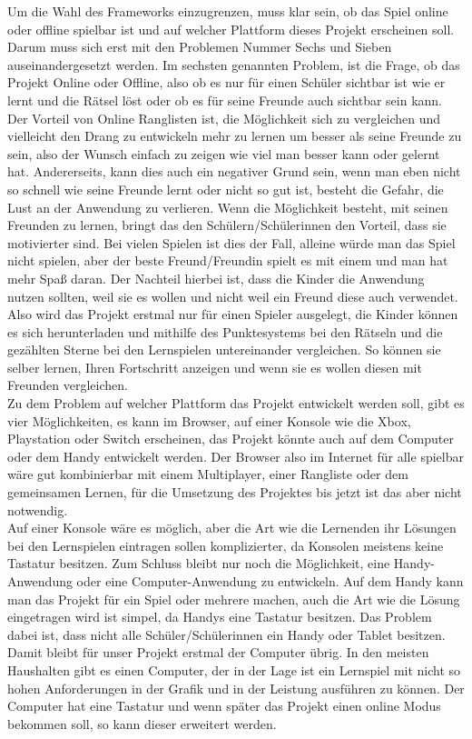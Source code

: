 Um die Wahl des Frameworks einzugrenzen, muss klar sein, ob das Spiel online oder offline spielbar ist und auf welcher Plattform dieses Projekt erscheinen soll.\\
Darum muss sich erst mit den Problemen Nummer Sechs und Sieben auseinandergesetzt werden.
Im sechsten genannten Problem, ist die Frage, ob das Projekt Online oder Offline, also ob es nur für einen Schüler sichtbar ist wie er lernt und die Rätsel löst oder ob es für seine Freunde auch sichtbar sein kann. Der Vorteil von Online Ranglisten ist, die Möglichkeit sich zu vergleichen und vielleicht den Drang zu entwickeln mehr zu lernen um besser als seine Freunde zu sein, also der Wunsch einfach zu zeigen wie viel man besser kann oder gelernt hat. Andererseits, kann dies auch ein negativer Grund sein, wenn man eben nicht so schnell wie seine Freunde lernt oder nicht so gut ist, besteht die Gefahr, die Lust an der Anwendung zu verlieren. Wenn die Möglichkeit besteht, mit seinen Freunden zu lernen, bringt das den Schülern/Schülerinnen den Vorteil, dass sie motivierter sind. Bei vielen Spielen ist dies der Fall, alleine würde man das Spiel nicht spielen, aber der beste Freund/Freundin spielt es mit einem und man hat mehr Spaß daran. Der Nachteil hierbei ist, dass die Kinder die Anwendung nutzen sollten, weil sie es wollen und nicht weil ein Freund diese auch verwendet. Also wird das Projekt erstmal nur für einen Spieler ausgelegt, die Kinder können es sich herunterladen und mithilfe des Punktesystems bei den Rätseln und die gezählten Sterne bei den Lernspielen untereinander vergleichen. So können sie selber lernen, Ihren Fortschritt anzeigen und wenn sie es wollen diesen mit Freunden vergleichen.\\
Zu dem Problem auf welcher Plattform das Projekt entwickelt werden soll, gibt es vier Möglichkeiten, es kann im Browser, auf einer Konsole wie die Xbox, Playstation oder Switch erscheinen, das Projekt könnte auch auf dem Computer oder dem Handy entwickelt werden. Der Browser also im Internet für alle spielbar wäre gut kombinierbar mit einem Multiplayer, einer Rangliste oder dem gemeinsamen Lernen, für die Umsetzung des Projektes bis jetzt ist das aber nicht notwendig.\\
Auf einer Konsole wäre es möglich, aber die Art wie die Lernenden ihr Lösungen bei den Lernspielen eintragen sollen komplizierter, da Konsolen meistens keine Tastatur besitzen. Zum Schluss bleibt nur noch die Möglichkeit, eine Handy-Anwendung oder eine Computer-Anwendung zu entwickeln. Auf dem Handy kann man das Projekt für ein Spiel oder mehrere machen, auch die Art wie die Lösung eingetragen wird ist simpel, da Handys eine Tastatur besitzen. Das Problem dabei ist, dass nicht alle Schüler/Schülerinnen ein Handy oder Tablet besitzen.\\
Damit bleibt für unser Projekt erstmal der Computer übrig. In den meisten Haushalten gibt es einen Computer, der in der Lage ist ein Lernspiel mit nicht so hohen Anforderungen in der Grafik und in der Leistung ausführen zu können. Der Computer hat eine Tastatur und wenn später das Projekt einen online Modus bekommen soll, so kann dieser erweitert werden.

